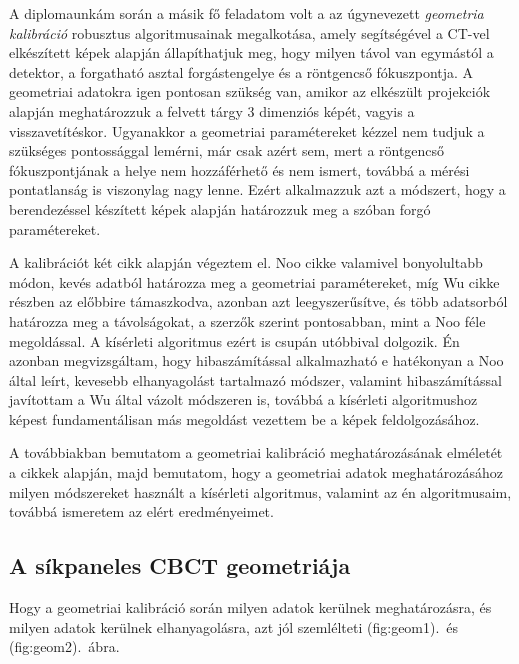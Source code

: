 \documentclass[a4paper,12pt]{article}
\begin{document}
A diplomaunkám során a másik fő feladatom volt a  az úgynevezett \emph{geometria kalibráció} robusztus algoritmusainak megalkotása, amely segítségével a CT-vel elkészített képek alapján állapíthatjuk meg, hogy milyen távol van egymástól a detektor, a forgatható asztal forgástengelye és a röntgencső fókuszpontja. A geometriai adatokra igen pontosan szükség van, amikor az elkészült projekciók alapján meghatározzuk a felvett tárgy 3 dimenziós képét, vagyis a visszavetítéskor. Ugyanakkor a geometriai paramétereket kézzel nem tudjuk a szükséges pontossággal lemérni, már csak azért sem, mert a röntgencső fókuszpontjának a helye nem hozzáférhető és nem ismert, továbbá a mérési pontatlanság is viszonylag nagy lenne. Ezért alkalmazzuk azt a módszert, hogy a berendezéssel készített képek alapján határozzuk meg a szóban forgó paramétereket. 

A kalibrációt két cikk alapján végeztem el. Noo cikke \cite{noo} valamivel bonyolultabb  módon, kevés adatból határozza meg a geometriai paramétereket, míg Wu \cite{wu} cikke részben az előbbire támaszkodva, azonban azt leegyszerűsítve,  és több adatsorból határozza meg a távolságokat, a szerzők szerint pontosabban, mint a Noo féle megoldással. A kísérleti algoritmus ezért is csupán utóbbival dolgozik. Én azonban megvizsgáltam, hogy hibaszámítással alkalmazható e hatékonyan a Noo által leírt, kevesebb elhanyagolást tartalmazó módszer, valamint hibaszámítással javítottam a Wu által vázolt módszeren is, továbbá a kísérleti algoritmushoz képest fundamentálisan más megoldást vezettem be a képek feldolgozásához.

 A továbbiakban bemutatom a geometriai kalibráció meghatározásának elméletét a cikkek alapján, majd bemutatom, hogy a geometriai adatok meghatározásához milyen módszereket használt a kísérleti algoritmus, valamint az én algoritmusaim, továbbá ismeretem az elért eredményeimet. 

\subsection{A síkpaneles CBCT geometriája}

Hogy a geometriai kalibráció során milyen adatok kerülnek meghatározásra, és milyen adatok kerülnek elhanyagolásra, azt jól szemlélteti \aref({fig:geom1}).\ és \aref({fig:geom2}).~ábra. 
\end{document}
